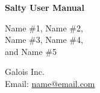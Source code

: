 \begin{titlepage}
\begin{center}
  \begin{Huge}
  \textbf{Salty User Manual}\\
  \end{Huge}
  \vspace{0.5cm}
  \vspace{4.0cm}

  \begin{Large}
    \begin{bf}
        Name \#1, Name \#2,\\
        Name \#3, Name \#4,\\
        and Name \#5

    \end{bf}
  \end{Large}

  \vspace{1cm}
  {Galois Inc.}\\

  \vspace{1cm}
  Email: \url{name@email.com}\\
  \vspace{4.0cm}
\end{center}
\vspace{1in}

\end{titlepage}





